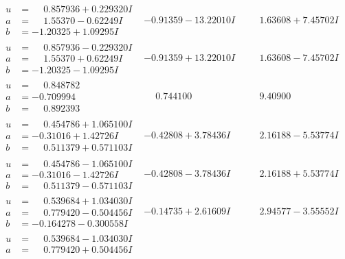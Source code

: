 \documentclass[1p]{elsarticle_modified}
\theoremstyle{definition}
\begin{document}
$$\begin{array}{c|c|c}
\begin{aligned}
u &= \phantom{-}0.857936 + 0.229320 I \\
a &= \phantom{-}1.55370 - 0.62249 I \\
b &= -1.20325 + 1.09295 I\end{aligned}
 & -0.91359 - 13.22010 I & \phantom{-}1.63608 + 7.45702 I \\ \hline\begin{aligned}
u &= \phantom{-}0.857936 - 0.229320 I \\
a &= \phantom{-}1.55370 + 0.62249 I \\
b &= -1.20325 - 1.09295 I\end{aligned}
 & -0.91359 + 13.22010 I & \phantom{-}1.63608 - 7.45702 I \\ \hline\begin{aligned}
u &= \phantom{-}0.848782\phantom{ +0.000000I} \\
a &= -0.709994\phantom{ +0.000000I} \\
b &= \phantom{-}0.892393\phantom{ +0.000000I}\end{aligned}
 & \phantom{-}0.744100\phantom{ +0.000000I} & \phantom{-}9.40900\phantom{ +0.000000I} \\ \hline\begin{aligned}
u &= \phantom{-}0.454786 + 1.065100 I \\
a &= -0.31016 + 1.42726 I \\
b &= \phantom{-}0.511379 + 0.571103 I\end{aligned}
 & -0.42808 + 3.78436 I & \phantom{-}2.16188 - 5.53774 I \\ \hline\begin{aligned}
u &= \phantom{-}0.454786 - 1.065100 I \\
a &= -0.31016 - 1.42726 I \\
b &= \phantom{-}0.511379 - 0.571103 I\end{aligned}
 & -0.42808 - 3.78436 I & \phantom{-}2.16188 + 5.53774 I \\ \hline\begin{aligned}
u &= \phantom{-}0.539684 + 1.034030 I \\
a &= \phantom{-}0.779420 - 0.504456 I \\
b &= -0.164278 - 0.300558 I\end{aligned}
 & -0.14735 + 2.61609 I & \phantom{-}2.94577 - 3.55552 I \\ \hline\begin{aligned}
u &= \phantom{-}0.539684 - 1.034030 I \\
a &= \phantom{-}0.779420 + 0.504456 I \\

\end{aligned}
\end{array}$$
\end{document}
